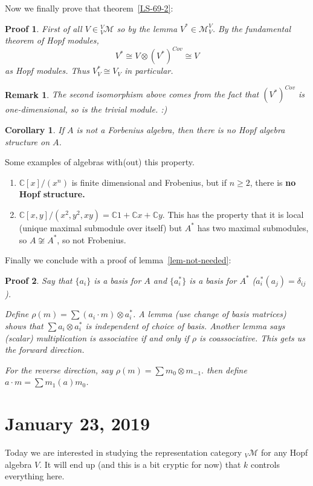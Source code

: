 \documentclass[12pt]{article}
\theoremstyle{break}
\theoremstyle{nonumberbreak}
\theoremstyle{changebreak}
\newtheorem{cor}[thm]{Corollary}
\theoremstyle{break}
\theoremstyle{nonumberbreak}
\newtheorem{prf}{Proof}
\theoremstyle{nonumberplain}
\theoremstyle{change}
\newtheorem{rmk}[thm]{Remark}
\newcommand*{\C}{
\mathbb{C}
}
\begin{document}
Now we finally prove that theorem~\ref{LS-69-2}:
\begin{prf}
	First of all $V\in{^V_V\mathcal{M}}$ so by the lemma $V^*\in\mathcal{M}_V^V$. By the fundamental theorem of Hopf modules,
	\[V^*\cong V\otimes(V^*)^{Cov}\cong V\]
	as Hopf modules. Thus $V_V^*\cong V_V$ in particular.
\end{prf}
\begin{rmk}
	The second isomorphism above comes from the fact that $(V^*)^{Cov}$ is one-dimensional, so is the trivial module. :)
\end{rmk}
\begin{cor}
	If $A$ is \textit{not} a Forbenius algebra, then there is \textit{no} Hopf algebra structure on $A$.
\end{cor}
\begin{ex}
	Some examples of algebras with(out) this property.
	\begin{enumerate}
		\item $\C[x]/(x^n)$ is finite dimensional and Frobenius, but if $n\ge 2$, there is \textbf{no Hopf structure.}
		\item $\C[x,y]/(x^2,y^2,xy)=\C1+\C x+\C y$. This has the property that it is local (unique maximal submodule over itself)
		but $A^*$ has two maximal submodules, so $A\not\cong A^*$, so not Frobenius.
	\end{enumerate}
\end{ex}
Finally we conclude with a proof of lemma~\ref{lem-not-needed}:
\begin{prf}
	Say that $\{a_i\}$ is a basis for $A$ and $\{a_i^*\}$ is a basis for $A^*$ ($a_i^*(a_j)=\delta_{ij}$).

	Define $\rho(m)=\sum(a_i\cdot m)\otimes a_i^*$. A lemma (use change of basis matrices) shows that
	$\sum a_i\otimes a_i^*$ is independent of choice of basis. Another lemma says (scalar) multiplication is associative
	if and only if $\rho$ is coassociative. This gets us the forward direction.

	For the reverse direction, say $\rho(m)=\sum m_0\otimes m_{-1}.$ then define $a\cdot m=\sum m_1(a)m_0$.
\end{prf}

\section{January 23, 2019}
Today we are interested in studying the representation category $_V\mathcal{M}$ for any Hopf algebra $V$. It will end up
(and this is a bit cryptic for now) that $k$ controls everything here.
\end{document}

